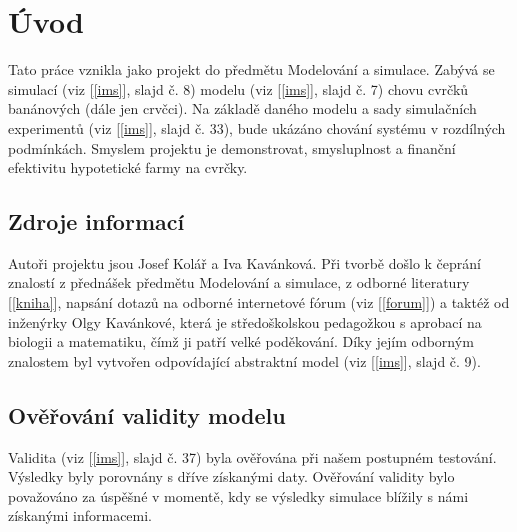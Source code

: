 \documentclass[11pt, a4paper, titlepage]{article}
\begin{document}
    
    \pagestyle{fancy}
    \tableofcontents
    \pagebreak

    \section{Úvod}
    Tato práce vznikla jako projekt do předmětu Modelování a simulace. Zabývá se simulací (viz [\ref{ims}], slajd č. 8)
    modelu (viz [\ref{ims}], slajd č. 7) chovu cvrčků banánových (dále jen crvčci). Na základě daného modelu a sady simulačních experimentů (viz [\ref{ims}], slajd č. 33),
    bude ukázáno chování systému v rozdílných podmínkách. Smyslem projektu je demonstrovat, smysluplnost a finanční efektivitu hypotetické farmy na cvrčky.

    \subsection{Zdroje informací}
    Autoři projektu jsou Josef Kolář a Iva Kavánková. Při tvorbě došlo k čeprání znalostí z přednášek předmětu Modelování a simulace, z odborné literatury
    [\ref{kniha}], napsání dotazů na odborné internetové fórum (viz [\ref{forum}]) a taktéž od inženýrky Olgy Kavánkové, která je středoškolskou pedagožkou s aprobací na biologii
    a matematiku, čímž ji patří velké poděkování. Díky jejím odborným znalostem byl vytvořen odpovídající abstraktní model
    (viz [\ref{ims}], slajd č. 9).

    \subsection{Ověřování validity modelu}
    Validita (viz [\ref{ims}], slajd č. 37) byla ověřována při našem postupném testování. Výsledky byly porovnány s dříve získanými daty.
    Ověřování validity bylo považováno za úspěšné v momentě, kdy se výsledky simulace blížily s námi získanými informacemi.
\end{document}
